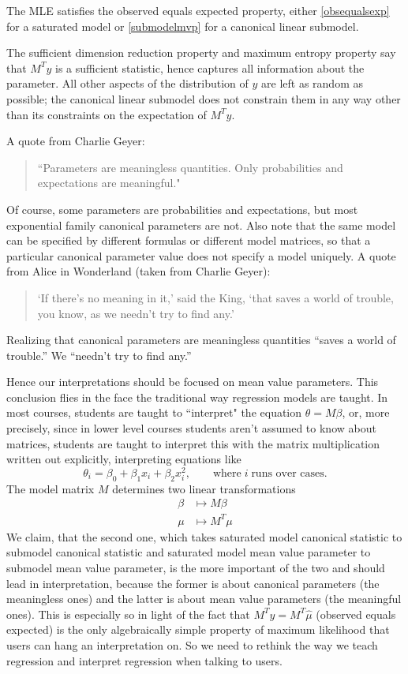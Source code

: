\documentclass[12pt]{article}
\begin{document}
The MLE satisfies the observed equals expected property, either \eqref{obsequalsexp} for a saturated model or \eqref{submodelmvp} for a canonical linear submodel.

The sufficient dimension reduction property and maximum entropy property say that $M^Ty$ is a sufficient statistic, hence captures all information about the parameter. All other aspects of the distribution of $y$ are left as random as possible; the canonical linear submodel does not constrain them in any way other than its constraints on the expectation of $M^Ty$.

A quote from Charlie Geyer:
\begin{quote}
``Parameters are meaningless quantities. Only probabilities and expectations are meaningful."	
\end{quote}
Of course, some parameters are probabilities and expectations, but most exponential family canonical parameters are not. Also note that the same model can be specified by different formulas or different model matrices, so that a particular canonical parameter value does not specify a model uniquely. A quote from Alice in Wonderland (taken from Charlie Geyer):
\begin{quote}
`If there’s no meaning in it,' said the King, `that saves a world
of trouble, you know, as we needn’t try to find any.'		
\end{quote}
Realizing that canonical parameters are meaningless quantities ``saves a world of trouble.'' We ``needn’t try to find any.''

Hence our interpretations should be focused on mean value parameters. This conclusion flies in the face the traditional way regression models are taught. In most courses, students are taught to ``interpret" the equation $\theta = M\beta$, or, more precisely, since in lower level courses students aren’t assumed to know about matrices, students are taught to interpret this with the matrix multiplication written out explicitly, interpreting equations like
$$
  \theta_i = \beta_0 + \beta_1x_i + \beta_2 x_i^2, \qquad \text{where} \; i \; \text{runs over cases}.
$$
The model matrix $M$ determines two linear transformations
\begin{align*}
  \beta &\mapsto M\beta	\\
  \mu &\mapsto M^T\mu
\end{align*}
We claim, that the second one, which takes saturated model canonical statistic to submodel canonical statistic and saturated model mean value parameter to submodel mean value parameter, is the more important of the two and should lead in interpretation, because the former is about canonical parameters (the meaningless ones) and the latter is about mean value parameters (the meaningful ones). This is especially so in light of the fact that $M^Ty = M^T\hat\mu$ (observed equals expected) is the only algebraically simple property of maximum likelihood that users can hang an interpretation on. So we need to rethink the way we teach regression and interpret regression when talking to users.
\end{document}
